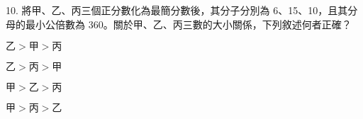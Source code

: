\documentclass[12pt]{article}
\begin{document}
\begin{problem}[widest=10]
  \item[10.] 將甲、乙、丙三個正分數化為最簡分數後，其分子分別為 6、15、10，且其分母的最小公倍數為 360。關於甲、乙、丙三數的大小關係，下列敘述何者正確？
  \begin{choices}
    \item $\textrm{乙} > \textrm{甲} > \textrm{丙}$
    \item $\textrm{乙} > \textrm{丙} > \textrm{甲}$
    \item $\textrm{甲} > \textrm{乙} > \textrm{丙}$
    \item $\textrm{甲} > \textrm{丙} > \textrm{乙}$
  \end{choices}
\end{problem}
\end{document}
